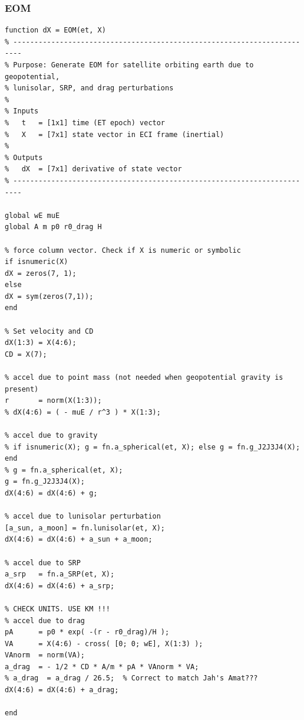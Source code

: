 \documentclass[conf]{new-aiaa}
\begin{document}
\subsubsection{EOM}
\begin{lstlisting}
function dX = EOM(et, X)
% ------------------------------------------------------------------------
% Purpose: Generate EOM for satellite orbiting earth due to geopotential,
% lunisolar, SRP, and drag perturbations 
% 
% Inputs 
%   t   = [1x1] time (ET epoch) vector 
%   X   = [7x1] state vector in ECI frame (inertial) 
% 
% Outputs 
%   dX  = [7x1] derivative of state vector 
% ------------------------------------------------------------------------

global wE muE 
global A m p0 r0_drag H  

% force column vector. Check if X is numeric or symbolic 
if isnumeric(X)
dX = zeros(7, 1);   
else 
dX = sym(zeros(7,1)); 
end

% Set velocity and CD 
dX(1:3) = X(4:6);
CD = X(7); 

% accel due to point mass (not needed when geopotential gravity is present)
r       = norm(X(1:3)); 
% dX(4:6) = ( - muE / r^3 ) * X(1:3); 

% accel due to gravity
% if isnumeric(X); g = fn.a_spherical(et, X); else g = fn.g_J2J3J4(X); end
% g = fn.a_spherical(et, X); 
g = fn.g_J2J3J4(X); 
dX(4:6) = dX(4:6) + g; 

% accel due to lunisolar perturbation 
[a_sun, a_moon] = fn.lunisolar(et, X); 
dX(4:6) = dX(4:6) + a_sun + a_moon; 

% accel due to SRP 
a_srp   = fn.a_SRP(et, X); 
dX(4:6) = dX(4:6) + a_srp; 

% CHECK UNITS. USE KM !!!
% accel due to drag 
pA      = p0 * exp( -(r - r0_drag)/H ); 
VA      = X(4:6) - cross( [0; 0; wE], X(1:3) ); 
VAnorm  = norm(VA); 
a_drag  = - 1/2 * CD * A/m * pA * VAnorm * VA;
% a_drag  = a_drag / 26.5;  % Correct to match Jah's Amat??? 
dX(4:6) = dX(4:6) + a_drag; 

end 
\end{lstlisting}
\end{document}
